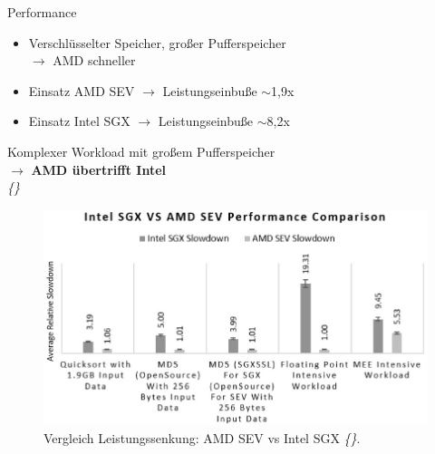 \documentclass{sdqbeamer}
\begin{document}
\begin{frame}{Performance}
	\begin{minipage}{0.49\linewidth}
		\begin{itemize}
			\item Verschlüsselter Speicher, großer Pufferspeicher \\ \(\rightarrow\) AMD schneller
			\item Einsatz AMD SEV \(\rightarrow\) Leistungseinbuße \begin{math} \sim \end{math}1,9x
			\item Einsatz Intel SGX  \(\rightarrow\) Leistungseinbuße \begin{math} \sim \end{math}8,2x
		\end{itemize}
		\vfill
		\color{kitgreen}
		{Komplexer Workload mit großem Pufferspeicher\\ \(\rightarrow\) \textbf{AMD übertrifft Intel}}
		\color{black}\\
		\vspace{3ex}
		\vfill
		\small\textit{\{\cite{mofrad}\}}
	\end{minipage}
	\begin{minipage}{0.5\linewidth}
		\begin{figure}[!h]
			\centering
			\includegraphics[width=\textwidth]{Bilder/performance.jpg}
			\caption{Vergleich Leistungssenkung: AMD SEV vs Intel SGX \textit{\{\cite{mofrad}\}}. }
		\end{figure}
	\end{minipage}
\end{frame}
\end{document}
